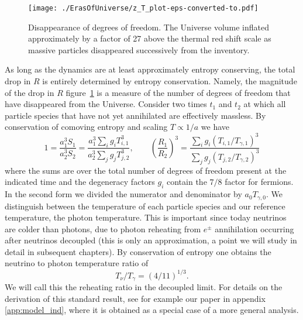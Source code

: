 \begin{figure} 
\centerline{\hspace*{0.4cm}\texttt{[image: ./ErasOfUniverse/z\_T\_plot-eps-converted-to.pdf]}}
\caption{Disappearance of degrees of freedom. The Universe volume inflated approximately by a factor of 27 above the thermal red shift scale as massive particles disappeared successively from the inventory.\label{fig:dof}}
 \end{figure}



As long as the dynamics are at least approximately entropy conserving, the total drop in $R$ is entirely determined by entropy conservation. Namely, the magnitude of the drop in $R$ figure~\ref{fig:dof} is a measure of the number of degrees of freedom that have disappeared from the Universe. Consider   two times $t_1$ and $t_2$ at which all particle species that have not yet annihilated are effectively massless.  By conservation of comoving entropy and  scaling $T\propto 1/a$ we have
\begin{equation}\label{r_ratio}
1=\frac{a_1^3S_{1}}{a_2^3 S_2}=\frac{a_1^3\sum_ig_i T_{i,1}^3}{a_2^3\sum_j g_j T_{j,2}^3},\qquad \left(\frac{R_1}{R_2}\right)^3=\frac{\sum_ig_i (T_{i,1}/T_{\gamma,1})^3}{\sum_j g_j (T_{j,2}/T_{\gamma,2})^3}
\end{equation}
where the sums are over the total number of degrees of freedom present at the indicated time and the degeneracy factors $g_i$ contain the $7/8$ factor for fermions. In the second form    we divided the numerator and denominator by $a_{0}T_{\gamma,0}$. We distinguish between the temperature of each particle species and our reference temperature, the photon temperature.  This is important since today neutrinos are colder than photons, due to photon reheating from  $e^\pm$ annihilation occurring after neutrinos decoupled (this is only an approximation, a point we will study in detail in subsequent chapters).  By conservation of entropy one obtains the neutrino to photon temperature ratio of
\begin{equation}\label{T_nu_T_gamma}
T_\nu/T_\gamma=({4}/{11})^{1/3}.
\end{equation}
We will call this the reheating ratio in the decoupled limit.  For details on the derivation of this standard result, see for example our paper in appendix \ref{app:model_ind}, where it is obtained as a special case of a more general analysis. 

